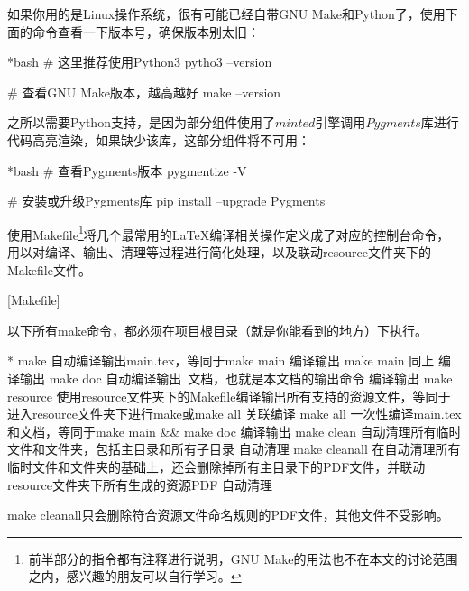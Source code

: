 如果你用的是Linux操作系统，很有可能已经自带GNU Make和Python了，使用下面的命令查看一下版本号，确保版本别太旧：

\begin{dkcode}*{bash}
# 这里推荐使用Python3
pytho3 --version

# 查看GNU Make版本，越高越好
make --version
\end{dkcode}

之所以需要Python支持，是因为{\dk}部分组件使用了$minted$引擎调用$Pygments$库进行代码高亮渲染，如果缺少该库，这部分组件将不可用：

\begin{dkcode}*{bash}
# 查看Pygments版本
pygmentize -V

# 安装或升级Pygments库
pip install --upgrade Pygments
\end{dkcode}

{\dk}使用Makefile\footnote{前半部分的指令都有注释进行说明，GNU Make的用法也不在本文的讨论范围之内，感兴趣的朋友可以自行学习。}将几个最常用的{\LaTeX}编译相关操作定义成了对应的控制台命令，用以对编译、输出、清理等过程进行简化处理，以及联动resource文件夹下的Makefile文件。

[Makefile]

\begin{dkcomment}
  以下所有make命令，都必须在项目根目录（就是你能看到的地方）下执行。
\end{dkcomment}

\begin{cvhonors}*
  \cvhonor
  {make}
  {自动编译输出main.tex，等同于make main}
  {编译输出}
  \cvhonor
  {make main}
  {同上}
  {编译输出}
  \cvhonor
  {make doc}
  {自动编译输出\dk~文档，也就是本文档的输出命令}
  {编译输出}
  \cvhonor
  {make resource}
  {使用resource文件夹下的Makefile编译输出所有支持的资源文件，等同于进入resource文件夹下进行make或make all}
  {关联编译}
  \cvhonor
  {make all}
  {一次性编译main.tex和{\dk}文档，等同于make main \&\& make doc}
  {编译输出}
  \cvhonor
  {make clean}
  {自动清理所有临时文件和文件夹，包括主目录和所有子目录}
  {自动清理}
  \cvhonor
  {make cleanall}
  {在自动清理所有临时文件和文件夹的基础上，还会删除掉所有主目录下的PDF文件，并联动resource文件夹下所有生成的资源PDF}
  {自动清理}
\end{cvhonors}

\begin{dkcomment}
  make cleanall只会删除符合资源文件命名规则的PDF文件，其他文件不受影响。
\end{dkcomment}

